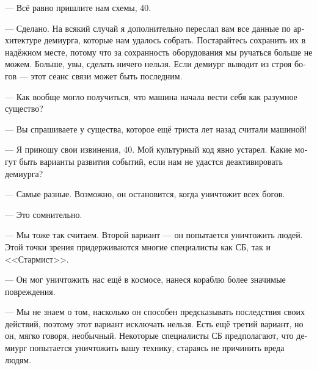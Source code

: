 \documentclass[a4paper,12pt,fleqn]{book}\usepackage{polyglossia}\setdefaultlanguage[babelshorthands=true]{russian}\setotherlanguage{english}\defaultfontfeatures{Ligatures=TeX,Mapping=tex-text}\usepackage{xcolor}\newcommand{\ml}[3]{#2}
\begin{document}
\ml{$0$}
{--- Всё равно пришлите нам схемы, 40.}
{``Send us the blueprints anyway, 40.''}

\ml{$0$}
{--- Сделано.}
{``It's done.}
\ml{$0$}
{На всякий случай я дополнительно переслал вам все данные по архитектуре демиурга, которые нам удалось собрать.}
{Just in case, I send you all the data on the demiurge architecture we could collect.}
Постарайтесь сохранить их в надёжном месте, потому что за сохранность оборудования мы ручаться больше не можем.
\ml{$0$}
{Больше, увы, сделать ничего нельзя.}
{And, I'm afraid, we've run out of options.}
Если демиург выводит из строя богов --- этот сеанс связи может быть последним.

\ml{$0$}
{--- Как вообще могло получиться, что машина начала вести себя как разумное существо?}
{``How is it possible that a machine started act like a sapient?''}

\ml{$0$}
{--- Вы спрашиваете у существа, которое ещё триста лет назад считали машиной!}
{``You're asking a specimen of sapients which were treated as machines just three hundred years ago!''}

--- Я приношу свои извинения, 40.
\ml{$0$}
{Мой культурный код явно устарел.}
{My culture background is obviously outdated.}
Какие могут быть варианты развития событий, если нам не удастся деактивировать демиурга?

--- Самые разные.
Возможно, он остановится, когда уничтожит всех богов.

\ml{$0$}
{--- Это сомнительно.}
{``Hard to believe.''}

--- Мы тоже так считаем.
\ml{$0$}
{Второй вариант --- он попытается уничтожить людей.}
{The second option: it will try to wipe humans out.}
Этой точки зрения придерживаются многие специалисты как СБ, так и <<Стармист>>.

\ml{$0$}
{--- Он мог уничтожить нас ещё в космосе, нанеся кораблю более значимые повреждения.}
{``It could do it in space, causing more serious damage to the ship.''}

\ml{$0$}
{--- Мы не знаем о том, насколько он способен предсказывать последствия своих действий, поэтому этот вариант исключать нельзя.}
{``We know nothing about its ability to predict consequences of its actions, so that option cannot be excluded.}
\ml{$0$}
{Есть ещё третий вариант, но он, мягко говоря, необычный.}
{There is one more, but this option, to put it mildly, unusual.}
\ml{$0$}
{Некоторые специалисты СБ предполагают, что демиург попытается уничтожить вашу технику, стараясь не причинить вреда людям.}
{Some SSC specialists suggest that the demiurge will try to destroy your equipment and not to harm humans.''}
\end{document}
